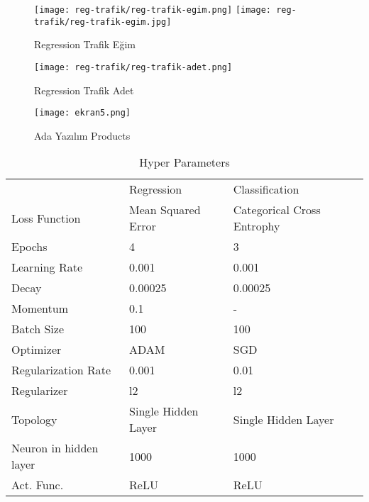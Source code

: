 \documentclass[titlepage, a4paper, 14pt]{extarticle} %
\begin{document}
\begin{figure}[H]
\centering
\texttt{[image: reg-trafik/reg-trafik-egim.png]}
\texttt{[image: reg-trafik/reg-trafik-egim.jpg]}
\caption{Regression Trafik Eğim}
\end{figure}

\begin{figure}[H]
\centering
\texttt{[image: reg-trafik/reg-trafik-adet.png]}
\caption{Regression Trafik Adet}
\end{figure}

\begin{figure}[H]
\centering
\texttt{[image: ekran5.png]}
\caption{Ada Yazılım Products}
\end{figure}

\begin{table}[H]
\centering
\caption{Hyper Parameters}
\label{my-label}
\begin{tabular}{lll}
                       & Regression          & Classification             \\
Loss Function          & Mean Squared Error  & Categorical Cross Entrophy \\
Epochs                 & 4                   & 3                          \\
Learning Rate          & 0.001               & 0.001                      \\
Decay                  & 0.00025             & 0.00025                    \\
Momentum               & 0.1                 & -                          \\
Batch Size             & 100                 & 100                        \\
Optimizer              & ADAM                & SGD                        \\
Regularization Rate    & 0.001               & 0.01                       \\
Regularizer            & l2                  & l2                         \\
Topology               & Single Hidden Layer & Single Hidden Layer        \\
Neuron in hidden layer & 1000                & 1000                       \\
Act. Func.             & ReLU                & ReLU                      
\end{tabular}
\end{table}
\end{document}
